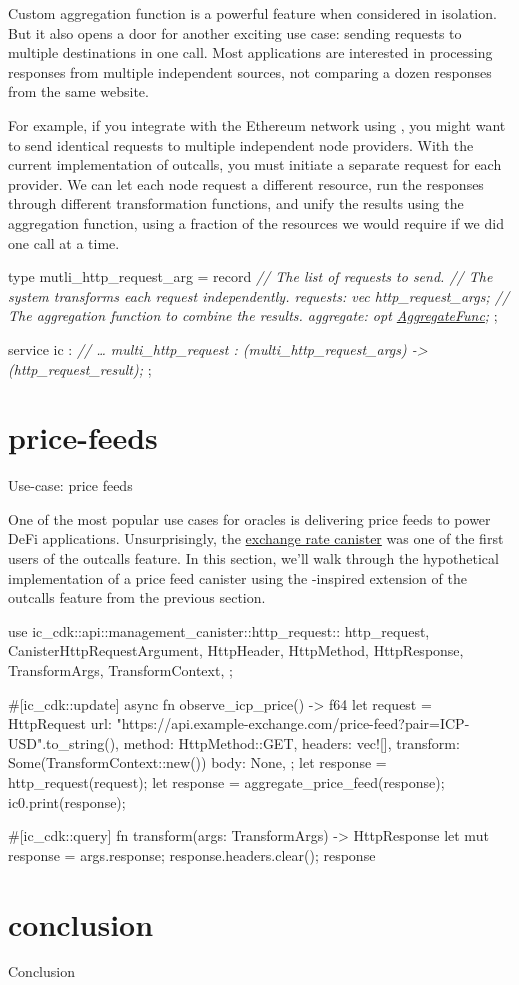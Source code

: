 \documentclass{article}
\begin{document}
Custom aggregation function is a powerful feature when considered in isolation.
But it also opens a door for another exciting use case: sending requests to multiple destinations in one call.
Most applications are interested in processing responses from multiple independent sources, not comparing a dozen responses from the same website.

For example, if you integrate with the Ethereum network using , you might want to send identical requests to multiple independent node providers.
With the current implementation of  outcalls, you must initiate a separate  request for each provider.
We can let each node request a different resource, run the responses through different transformation functions, and unify the results using the aggregation function, using a fraction of the resources we would require if we did one call at a time.

\begin{code}[candid]
type mutli_http_request_arg = record {
    \em{// The list of requests to send.}
    \em{// The system transforms each request independently.}
    requests: vec http_request_args;
    \em{// The aggregation function to combine the results.}
    aggregate: opt \href{#aggregate-func}{AggregateFunc};
};

service ic : {
    \em{// \ldots}
    multi_http_request : (multi_http_request_args) -> (http_request_result);
};
\end{code}

\section{price-feeds}{Use-case: price feeds}

One of the most popular use cases for oracles is delivering price feeds to power DeFi applications.
Unsurprisingly, the \href{https://internetcomputer.org/docs/current/developer-docs/defi/exchange-rate-canister}{exchange rate canister} was one of the first users of the  outcalls feature.
In this section, we'll walk through the hypothetical implementation of a price feed canister using the -inspired extension of the  outcalls feature from the previous section.

\begin{code}[rust]
use ic_cdk::api::management_canister::http_request::{
    http_request, CanisterHttpRequestArgument, HttpHeader, HttpMethod, HttpResponse, TransformArgs,
    TransformContext,
};

#[ic_cdk::update]
async fn observe_icp_price() -> f64 {
    let request = HttpRequest {
        url: "https://api.example-exchange.com/price-feed?pair=ICP-USD".to_string(),
        method: HttpMethod::GET,
        headers: vec![],
        transform: Some(TransformContext::new())
        body: None,
    };
    let response = http_request(request);
    let response = aggregate_price_feed(response);
    ic0.print(response);
}

#[ic_cdk::query]
fn transform(args: TransformArgs) -> HttpResponse {
    let mut response = args.response;
    response.headers.clear();
    response
}
\end{code}

\section{conclusion}{Conclusion}
\end{document}
